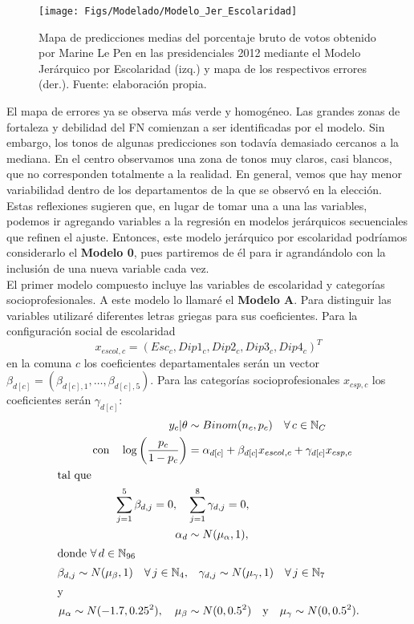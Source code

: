 \begin{figure}[h]
	\centering
	\texttt{[image: Figs/Modelado/Modelo\_Jer\_Escolaridad]}
	\caption{Mapa de predicciones medias del porcentaje bruto de votos obtenido por Marine Le Pen en las presidenciales 2012 mediante el Modelo Jerárquico por Escolaridad (izq.) y mapa de los respectivos errores (der.). Fuente: elaboración propia.}
	\label{fig:Modelo_Jer_Escolaridad}
\end{figure}

El mapa de errores ya se observa más verde y homogéneo. Las grandes zonas de fortaleza y debilidad del FN comienzan a ser identificadas por el modelo. Sin embargo, los tonos de algunas predicciones son todavía demasiado cercanos a la mediana. En el centro observamos una zona de tonos muy claros, casi blancos, que no corresponden totalmente a la realidad. En general, vemos que hay menor variabilidad dentro de los departamentos de la que se observó en la elección.\\ 

Estas reflexiones sugieren que, en lugar de tomar una a una las variables, podemos ir agregando variables a la regresión en modelos jerárquicos secuenciales que refinen el ajuste. Entonces, este modelo jerárquico por escolaridad podríamos considerarlo el \textbf{Modelo 0}, pues partiremos de él para ir agrandándolo con la inclusión de una nueva variable cada vez.\\ 

El primer modelo compuesto incluye las variables de escolaridad y categorías socioprofesionales. A este modelo lo llamaré el \textbf{Modelo A}. Para distinguir las variables utilizaré diferentes letras griegas para sus coeficientes. Para la configuración social de escolaridad 
\[x_{escol,c} = (Esc_c,Dip1_c,Dip2_c,Dip3_c,Dip4_c)^T\]
en la comuna $c$ los coeficientes departamentales serán un vector $\beta_{d[c]} = (\beta_{d[c],1},\dots,\beta_{d[c],5})$. Para las categorías socioprofesionales $x_{csp,c}$ los coeficientes serán $\gamma_{d[c]}$:
\begin{align}\label{eq:Modelo_Comp_A}
y_c|\theta & \sim Binom(n_c,p_c) \quad \forall \, c \in \mathbb{N}_C \nonumber \\
\text{con} \quad \log\left(\dfrac{p_c}{1-p_c}\right) &= \alpha_{d[c]} + \beta_{d[c]} x_{escol,c} + \gamma_{d[c]} x_{csp,c} \\ 
\shortintertext{tal que} 
\sum\limits_{j = 1}^{5} \beta_{d,j}=0, \quad & \sum\limits_{j = 1}^{8} \gamma_{d,j}=0, \nonumber \\
\alpha_d & \sim N(\mu_{\alpha}, 1), \nonumber \\
\shortintertext{donde $\forall \, d \in \mathbb{N}_{96}$}
\beta_{d,j} \sim N(\mu_{\beta}, 1) \quad \forall \, j \in \mathbb{N}_{4}, & \quad \gamma_{d,j} \sim N(\mu_{\gamma}, 1) \quad \forall \, j \in \mathbb{N}_{7} \nonumber \\
\shortintertext{y}
\mu_{\alpha} \sim N(-1.7, 0.25^2), \quad \mu_{\beta} &\sim N(0, 0.5^2) \quad \text{y} \quad \mu_{\gamma} \sim N(0,0.5^2). \nonumber
\end{align}


